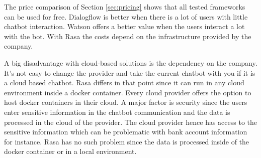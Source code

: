 The price comparison of Section \ref{sec:pricing} shows that all 
tested frameworks can be used for free.
Dialogflow is better when there is a lot of users with little chatbot interaction.
Watson offers a better value when the users interact a lot with the bot.
With Rasa the costs depend on the infrastructure provided by the company.

A big disadvantage with cloud-based solutions is the dependency on the company.
It's not easy to change the provider and take the current chatbot with you if it 
is a cloud based chatbot. 
Rasa differs in that point since it can run in any cloud environment inside a docker container.
Every cloud provider offers the option to host docker containers in their cloud.
A major factor is security since the users enter sensitive information in the chatbot communication
and the data is processed in the cloud of the provider.
The cloud provider hence has access to the sensitive information which can be problematic with
bank account information for instance.
Rasa has no such problem since the data is processed inside of the docker container or in a 
local environment.